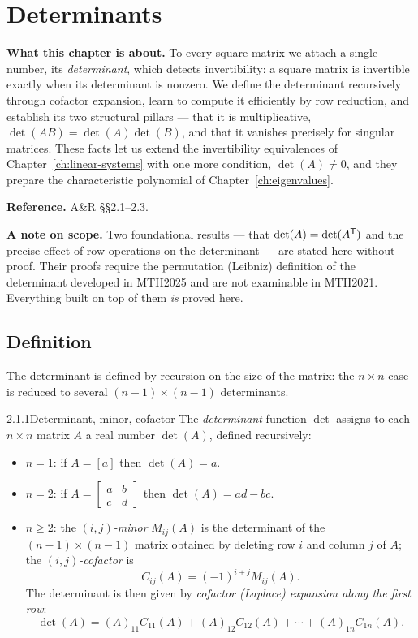 \chapter{Determinants}
\label{ch:determinants}

\begin{roadmap}
\noindent\textbf{What this chapter is about.}\;
To every square matrix we attach a single number, its \emph{determinant}, which detects invertibility: a square matrix is invertible exactly when its determinant is nonzero. We define the determinant recursively through cofactor expansion, learn to compute it efficiently by row reduction, and establish its two structural pillars --- that it is multiplicative, $\det(AB)=\det(A)\det(B)$, and that it vanishes precisely for singular matrices. These facts let us extend the invertibility equivalences of Chapter~\ref{ch:linear-systems} with one more condition, $\det(A)\neq0$, and they prepare the characteristic polynomial of Chapter~\ref{ch:eigenvalues}.
\medskip

\noindent\textbf{Reference.}\; A\&R \S\S2.1--2.3.

\noindent\textbf{A note on scope.}\; Two foundational results --- that $\det(A)=\det(A^{\mathsf{T}})$ and the precise effect of row operations on the determinant --- are stated here without proof. Their proofs require the permutation (Leibniz) definition of the determinant developed in MTH2025 and are not examinable in MTH2021. Everything built on top of them \emph{is} proved here.
\end{roadmap}

\section{Definition}
\label{sec:2.1}

The determinant is defined by recursion on the size of the matrix: the $n\times n$ case is reduced to several $(n-1)\times(n-1)$ determinants.

\begin{defns}{2.1.1}{Determinant, minor, cofactor}
The \emph{determinant} function $\det$ assigns to each $n\times n$ matrix $A$ a real number $\det(A)$, defined recursively:
\begin{itemize}[leftmargin=1.4em,itemsep=2pt]
\item $n=1$: if $A=[a]$ then $\det(A)=a$.
\item $n=2$: if $A=\left[\begin{smallmatrix}a&b\\c&d\end{smallmatrix}\right]$ then $\det(A)=ad-bc$.
\item $n\ge2$: the \emph{$(i,j)$-minor} $M_{ij}(A)$ is the determinant of the $(n-1)\times(n-1)$ matrix obtained by deleting row $i$ and column $j$ of $A$; the \emph{$(i,j)$-cofactor} is
\[
C_{ij}(A)=(-1)^{i+j}M_{ij}(A).
\]
The determinant is then given by \emph{cofactor (Laplace) expansion along the first row}:
\[
\det(A)=(A)_{11}C_{11}(A)+(A)_{12}C_{12}(A)+\cdots+(A)_{1n}C_{1n}(A).
\]
\end{itemize}
\end{defns}

